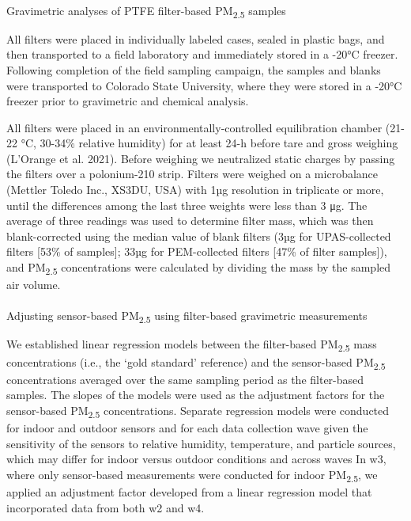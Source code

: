 \documentclass[
  letterpaper,
  DIV=11,
  numbers=noendperiod]{scrartcl}
\makeatletter
\let\oldparagraph\paragraph
\renewcommand{\paragraph}{
    \@ifstar
      \xxxParagraphStar
      \xxxParagraphNoStar
  }
\newcommand{\xxxParagraphStar}[1]{\oldparagraph*{#1}\mbox{}}
\newcommand{\xxxParagraphNoStar}[1]{\oldparagraph{#1}\mbox{}}
\makeatother
\begin{document}
\paragraph{\texorpdfstring{Gravimetric analyses of PTFE filter-based
PM\textsubscript{2.5}
samples}{Gravimetric analyses of PTFE filter-based PM2.5 samples}}\label{gravimetric-analyses-of-ptfe-filter-based-pm2.5-samples}

All filters were placed in individually labeled cases, sealed in plastic
bags, and then transported to a field laboratory and immediately stored
in a -20°C freezer. Following completion of the field sampling campaign,
the samples and blanks were transported to Colorado State University,
where they were stored in a -20°C freezer prior to gravimetric and
chemical analysis.

All filters were placed in an environmentally-controlled equilibration
chamber (21-22 °C, 30-34\% relative humidity) for at least 24-h before
tare and gross weighing (L'Orange et al. 2021). Before weighing we
neutralized static charges by passing the filters over a polonium-210
strip. Filters were weighed on a microbalance (Mettler Toledo Inc.,
XS3DU, USA) with 1µg resolution in triplicate or more, until the
differences among the last three weights were less than 3 μg. The
average of three readings was used to determine filter mass, which was
then blank-corrected using the median value of blank filters (3µg for
UPAS-collected filters {[}53\% of samples{]}; 33µg for PEM-collected
filters {[}47\% of filter samples{]}), and PM\textsubscript{2.5}
concentrations were calculated by dividing the mass by the sampled air
volume.

\paragraph{\texorpdfstring{Adjusting sensor-based PM\textsubscript{2.5}
using filter-based gravimetric
measurements}{Adjusting sensor-based PM2.5 using filter-based gravimetric measurements}}\label{adjusting-sensor-based-pm2.5-using-filter-based-gravimetric-measurements}

We established linear regression models between the filter-based
PM\textsubscript{2.5} mass concentrations (i.e., the `gold standard'
reference) and the sensor-based PM\textsubscript{2.5} concentrations
averaged over the same sampling period as the filter-based samples. The
slopes of the models were used as the adjustment factors for the
sensor-based PM\textsubscript{2.5} concentrations. Separate regression
models were conducted for indoor and outdoor sensors and for each data
collection wave given the sensitivity of the sensors to relative
humidity, temperature, and particle sources, which may differ for indoor
versus outdoor conditions and across waves In w3, where only
sensor-based measurements were conducted for indoor
PM\textsubscript{2.5}, we applied an adjustment factor developed from a
linear regression model that incorporated data from both w2 and w4.
\end{document}
